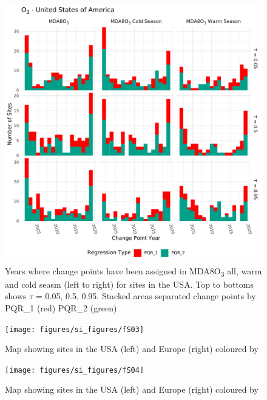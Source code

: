 \documentclass{article}
\begin{document}
\begin{figure}[p]
\centering
\includegraphics[width=\linewidth]{figures/si_figures/fS02_cp_year_o3_United-States-of-America.pdf}
\caption{Years where change points have been assigned in MDA8O\textsubscript{3} all, warm and cold seasm (left to right) for sites in the USA. Top to bottoms shows $\tau$ = 0.05, 0.5, 0.95. Stacked areas separated change points by PQR_1 (red) PQR_2 (green)}
\label{si_fig:cp_year_usa}
\end{figure}
\clearpage

\begin{figure}
\centering
\texttt{[image: figures/si\_figures/fS03]}
\caption{Map showing sites in the USA (left) and Europe (right) coloured by }
\label{si_fig:reg_map}
\end{figure}
\clearpage

\begin{figure}
\centering
\texttt{[image: figures/si\_figures/fS04]}
\caption{Map showing sites in the USA (left) and Europe (right) coloured by }
\label{si_fig:reg_map}
\end{figure}
\clearpage

\end{document}
